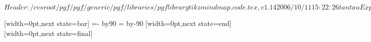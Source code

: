 %
%
%

\ProvidesFileRCS[v\pgfversion] $Header: /cvsroot/pgf/pgf/generic/pgf/libraries/pgflibrarytikzmindmap.code.tex,v 1.14 2006/10/11 15:22:26 tantau Exp $



%

{
  [width=0pt,next state=bar]
  {
    {
    \pgftransformxshift{-\pgfsnakecirclestartradius}%
    \pgfpathmoveto{\pgfpointpolar{\pgfsnakesegmentangle}{\pgfsnakecirclestartradius}}
    \pgfpatharc{\pgfsnakesegmentangle}{-\pgfsnakesegmentangle}{\pgfsnakecirclestartradius}
    \@tempcnta=-\pgfsnakesegmentangle\relax
    \advance\@tempcnta by90\relax
    \setlength\@tempdima{\pgfsnakecirclestartradius}
    \setlength\@tempdimb{\pgfsnakesegmentamplitude}
    \pgfpathcurveto
    {\pgfpointadd
      {\pgfpointpolar{-\pgfsnakesegmentangle}{\pgfsnakecirclestartradius}}
      {}}
    {}
    {}
    \@tempcnta=\pgfsnakesegmentangle\relax
    \advance\@tempcnta by-90\relax
    \pgfpathcurveto
    {}
    {\pgfpointadd
      {\pgfpointpolar{\pgfsnakesegmentangle}{\pgfsnakecirclestartradius}}
      {}}
    {\pgfpointpolar{\pgfsnakesegmentangle}{\pgfsnakecirclestartradius}}
    \pgfpathclose
    }
  }
  [width=0pt,next state=end]
  {
    \setlength\@tempdima{\pgfsnakecirclestartradius}%
    \setlength\@tempdimb{\pgfsnakecircleendradius}%
    \setlength\pgf@xc{\pgfsnakesegmentamplitude}%
    \pgfpathrectangle
    {}
    {}
  }
  [width=0pt,next state=final]
  {
    {
    \pgftransformxshift{\pgfsnakeremainingdistance}%
    \pgftransformxshift{-\pgfsnakecircleendradius}%
    \pgfpathmoveto{\pgfpointpolar{\pgfsnakesegmentangle}{\pgfsnakecircleendradius}}
    \pgfpatharc{\pgfsnakesegmentangle}{-\pgfsnakesegmentangle}{\pgfsnakecircleendradius}
}}}
